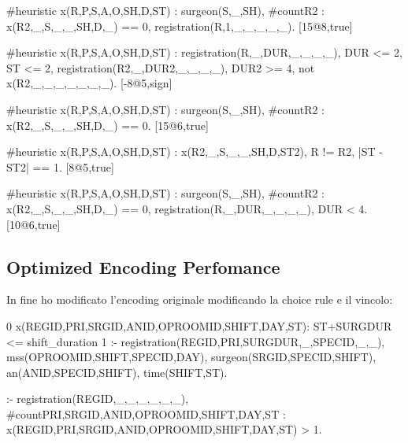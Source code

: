 \documentclass[11pt,a4paper]{article}
\begin{document}
#heuristic 
    x(R,P,S,A,O,SH,D,ST) :  surgeon(S,_,SH), 
                            #count{R2 : x(R2,_,S,_,_,SH,D,_)} == 0,
                            registration(R,1,_,_,_,_,_). 
[15@8,true]


#heuristic 
    x(R,P,S,A,O,SH,D,ST) :  registration(R,_,DUR,_,_,_,_), 
                            DUR <= 2, ST <= 2, 
                            registration(R2,_,DUR2,_,_,_,_), 
                            DUR2 >= 4, 
                            not x(R2,_,_,_,_,_,_,_). 
[-8@5,sign]


#heuristic 
    x(R,P,S,A,O,SH,D,ST) :  surgeon(S,_,SH), 
                            #count{R2 : x(R2,_,S,_,_,SH,D,_)} == 0. 
[15@6,true]


#heuristic 
    x(R,P,S,A,O,SH,D,ST) :  x(R2,_,S,_,_,SH,D,ST2), 
                            R != R2, |ST - ST2| == 1. 
[8@5,true]


#heuristic
    x(R,P,S,A,O,SH,D,ST) :  surgeon(S,_,SH),
                            #count{R2 : x(R2,_,S,_,_,SH,D,_)} == 0,
                            registration(R,_,DUR,_,_,_,_), DUR < 4.
[10@6,true]


\subsection{Optimized Encoding Perfomance}

In fine ho modificato l'encoding originale modificando la choice rule e il vincolo:

0 {
    x(REGID,PRI,SRGID,ANID,OPROOMID,SHIFT,DAY,ST): 
        ST+SURGDUR <= shift_duration
    } 
1 :- 
registration(REGID,PRI,SURGDUR,_,SPECID,_,_),
mss(OPROOMID,SHIFT,SPECID,DAY),
surgeon(SRGID,SPECID,SHIFT),
an(ANID,SPECID,SHIFT),
time(SHIFT,ST).

:- registration(REGID,_,_,_,_,_,_), #count{PRI,SRGID,ANID,OPROOMID,SHIFT,DAY,ST : x(REGID,PRI,SRGID,ANID,OPROOMID,SHIFT,DAY,ST)} > 1.
\end{document}
